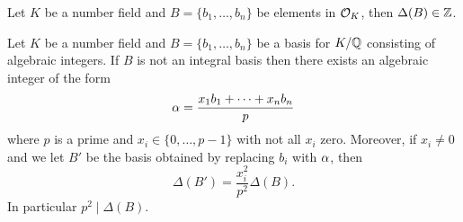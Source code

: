 \begin{lemma}\label{lemma:_int_basis_int_disc}
	Let $K$ be a number field and $B=\{b_1,\dots,b_n\}$ be elements in $\mathcal{O}_K$, then $\Delta(B) \in \mathbb{Z}$.
\end{lemma}	

\begin{lemma}\label{lemma:_disc_int_basis}
	Let $K$ be a number field and $B=\{b_1,\dots,b_n\}$ be a basis for $K/\mathbb{Q}$ consisting of algebraic integers. If $B$ is not an integral basis then there exists an algebraic integer of the form \[\alpha=\frac{x_1b_1+\cdots+x_nb_n}{p}\] where $p$ is a prime and $x_i \in \{0,\dots,p-1\}$ with not all $x_i$ zero. Moreover, if $x_i \neq 0$ and we let $B'$ be the basis obtained by replacing $b_i$ with $\alpha$, then \[\Delta(B')= \frac{x_i^2}{p^2} \Delta(B).\] In particular $p^2 \mid \Delta(B)$.
\end{lemma} 

